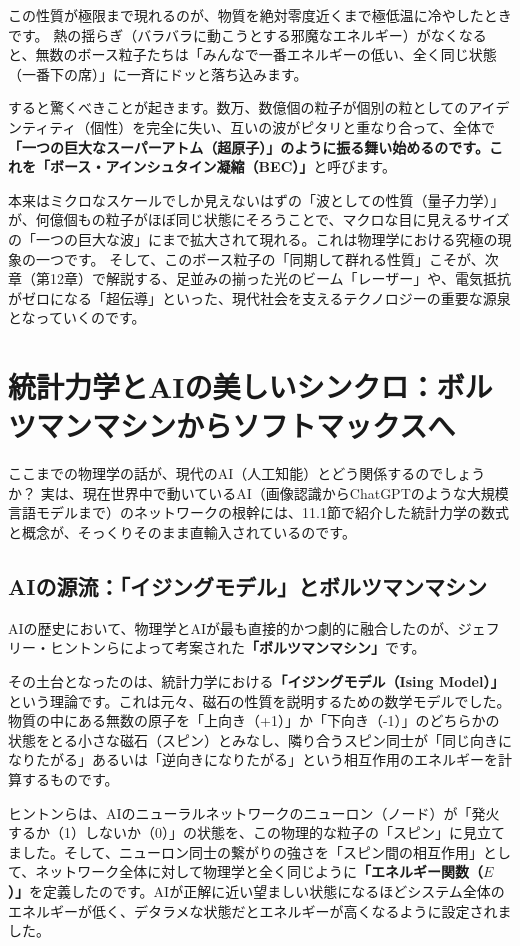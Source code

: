 この性質が極限まで現れるのが、物質を絶対零度近くまで極低温に冷やしたときです。 熱の揺らぎ（バラバラに動こうとする邪魔なエネルギー）がなくなると、無数のボース粒子たちは「みんなで一番エネルギーの低い、全く同じ状態（一番下の席）」に一斉にドッと落ち込みます。

すると驚くべきことが起きます。数万、数億個の粒子が個別の粒としてのアイデンティティ（個性）を完全に失い、互いの波がピタリと重なり合って、全体で\textbf{「一つの巨大なスーパーアトム（超原子）」のように振る舞い始めるのです。これを「ボース・アインシュタイン凝縮（BEC）」}と呼びます。

本来はミクロなスケールでしか見えないはずの「波としての性質（量子力学）」が、何億個もの粒子がほぼ同じ状態にそろうことで、マクロな目に見えるサイズの「一つの巨大な波」にまで拡大されて現れる。これは物理学における究極の現象の一つです。 そして、このボース粒子の「同期して群れる性質」こそが、次章（第12章）で解説する、足並みの揃った光のビーム「レーザー」や、電気抵抗がゼロになる「超伝導」といった、現代社会を支えるテクノロジーの重要な源泉となっていくのです。

\section{統計力学とAIの美しいシンクロ：ボルツマンマシンからソフトマックスへ}

ここまでの物理学の話が、現代のAI（人工知能）とどう関係するのでしょうか？ 実は、現在世界中で動いているAI（画像認識からChatGPTのような大規模言語モデルまで）のネットワークの根幹には、11.1節で紹介した統計力学の数式と概念が、そっくりそのまま直輸入されているのです。

\subsection{AIの源流：「イジングモデル」とボルツマンマシン}

AIの歴史において、物理学とAIが最も直接的かつ劇的に融合したのが、ジェフリー・ヒントンらによって考案された\textbf{「ボルツマンマシン」}です。

その土台となったのは、統計力学における\textbf{「イジングモデル（Ising Model）」}という理論です。これは元々、磁石の性質を説明するための数学モデルでした。物質の中にある無数の原子を「上向き（+1）」か「下向き（-1）」のどちらかの状態をとる小さな磁石（スピン）とみなし、隣り合うスピン同士が「同じ向きになりたがる」あるいは「逆向きになりたがる」という相互作用のエネルギーを計算するものです。

ヒントンらは、AIのニューラルネットワークのニューロン（ノード）が「発火するか（1）しないか（0）」の状態を、この物理的な粒子の「スピン」に見立てました。そして、ニューロン同士の繋がりの強さを「スピン間の相互作用」として、ネットワーク全体に対して物理学と全く同じように\textbf{「エネルギー関数（\(E\)）」}を定義したのです。AIが正解に近い望ましい状態になるほどシステム全体のエネルギーが低く、デタラメな状態だとエネルギーが高くなるように設定されました。

